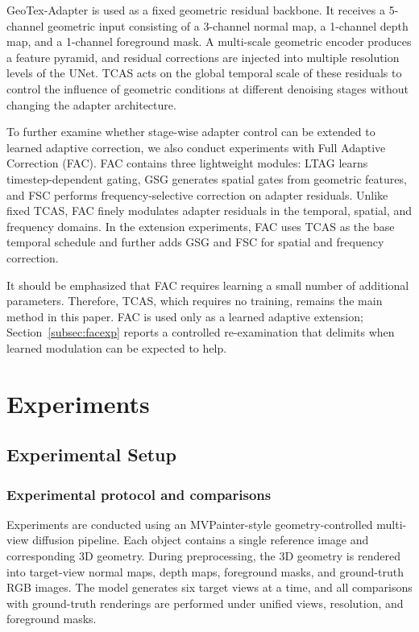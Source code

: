 \documentclass[times,twocolumn,final]{elsarticle}
\begin{document}
GeoTex-Adapter is used as a fixed geometric residual backbone. It receives a 5-channel geometric input consisting of a 3-channel normal map, a 1-channel depth map, and a 1-channel foreground mask. A multi-scale geometric encoder produces a feature pyramid, and residual corrections are injected into multiple resolution levels of the UNet. TCAS acts on the global temporal scale of these residuals to control the influence of geometric conditions at different denoising stages without changing the adapter architecture.

To further examine whether stage-wise adapter control can be extended to learned adaptive correction, we also conduct experiments with Full Adaptive Correction (FAC). FAC contains three lightweight modules: LTAG learns timestep-dependent gating, GSG generates spatial gates from geometric features, and FSC performs frequency-selective correction on adapter residuals. Unlike fixed TCAS, FAC finely modulates adapter residuals in the temporal, spatial, and frequency domains. In the extension experiments, FAC uses TCAS as the base temporal schedule and further adds GSG and FSC for spatial and frequency correction.

It should be emphasized that FAC requires learning a small number of additional parameters. Therefore, TCAS, which requires no training, remains the main method in this paper. FAC is used only as a learned adaptive extension; Section~\ref{subsec:facexp} reports a controlled re-examination that delimits when learned modulation can be expected to help.

\section{Experiments}
\label{sec:experiments}

\subsection{Experimental Setup}
\label{subsec:setup}

\subsubsection{Experimental protocol and comparisons}

Experiments are conducted using an MVPainter-style geometry-controlled multi-view diffusion pipeline. Each object contains a single reference image and corresponding 3D geometry. During preprocessing, the 3D geometry is rendered into target-view normal maps, depth maps, foreground masks, and ground-truth RGB images. The model generates six target views at a time, and all comparisons with ground-truth renderings are performed under unified views, resolution, and foreground masks.
\end{document}

